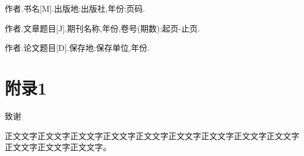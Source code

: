 \documentclass[a4paper,12pt]{ctexart}
\begin{document}
\begin{enumerate}[label={[\arabic*]},leftmargin=*,nosep]
\item 作者.书名[M].出版地:出版社,年份:页码.
\item 作者.文章题目[J].期刊名称,年份,卷号(期数):起页-止页.
\item 作者.论文题目[D].保存地:保存单位,年份.
\end{enumerate}

\clearpage
\section*{附录1}


\clearpage
\begin{center}
{\heiti\fontsize{18pt}{18pt}\selectfont 致\hspace{2em}谢}
\end{center}
\vspace{1cm}

正文文字正文文字正文文字正文文字正文文字正文文字正文文字正文文字正文文字正文文字正文文字正文文字。
\end{document}
